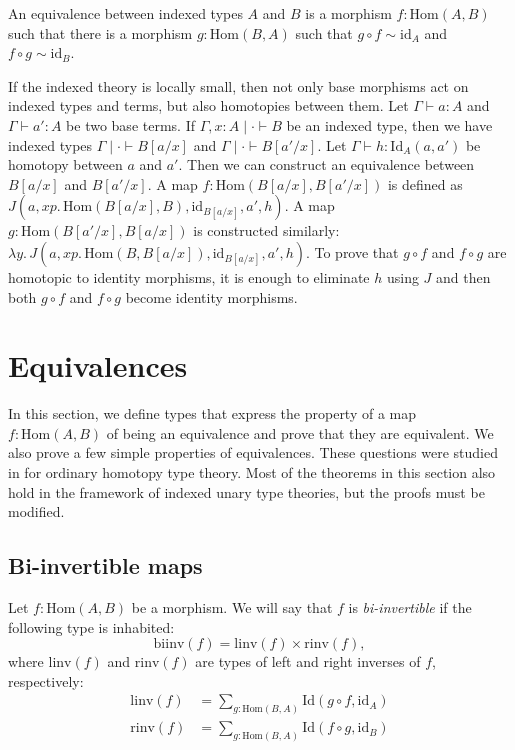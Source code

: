\documentclass[reqno]{amsart}
\theoremstyle{definition}
\theoremstyle{remark}
\newcommand{\ob}{}
\newcommand{\fs}[1]{\mathrm{#1}}
\newcommand{\Hom}{\fs{Hom}}
\newcommand{\Id}{\fs{Id}}
\newcommand{\id}{\fs{id}}
\numberwithin{figure}{section}
\begin{document}
\begin{defn}
An equivalence between indexed types $A$ and $B$ is a morphism $f : \Hom(A,B)$ such that there is a morphism $g : \Hom(B,A)$ such that $g \circ f \sim \id_A$ and $f \circ g \sim \id_B$.
\end{defn}

If the indexed theory is locally small, then not only base morphisms act on indexed types and terms, but also homotopies between them.
Let $\Gamma \vdash a : A$ and $\Gamma \vdash a' : A$ be two base terms.
If $\Gamma, x : A \mid \cdot \vdash B \ob$ be an indexed type, then we have indexed types $\Gamma \mid \cdot \vdash B[a/x] \ob$ and $\Gamma \mid \cdot \vdash B[a'/x] \ob$.
Let $\Gamma \vdash h : \Id_A(a,a')$ be homotopy between $a$ and $a'$.
Then we can construct an equivalence between $B[a/x]$ and $B[a'/x]$.
A map $f : \Hom(B[a/x],B[a'/x])$ is defined as $J(a, x p.\,\Hom(B[a/x],B), \id_{B[a/x]}, a', h)$.
A map $g : \Hom(B[a'/x],B[a/x])$ is constructed similarly: $\lambda y.\,J(a, x p.\,\Hom(B,B[a/x]), \id_{B[a/x]}, a', h)$.
To prove that $g \circ f$ and $f \circ g$ are homotopic to identity morphisms, it is enough to eliminate $h$ using $J$ and then both $g \circ f$ and $f \circ g$ become identity morphisms.

\section{Equivalences}

In this section, we define types that express the property of a map $f : \Hom(A,B)$ of being an equivalence and prove that they are equivalent.
We also prove a few simple properties of equivalences.
These questions were studied in \cite[Section~4]{hottbook} for ordinary homotopy type theory.
Most of the theorems in this section also hold in the framework of indexed unary type theories, but the proofs must be modified.

\subsection{Bi-invertible maps}

Let $f : \Hom(A,B)$ be a morphism.
We will say that $f$ is \emph{bi-invertible} if the following type is inhabited:
\[ \fs{biinv}(f) = \fs{linv}(f) \times \fs{rinv}(f), \]
where $\fs{linv}(f)$ and $\fs{rinv}(f)$ are types of left and right inverses of $f$, respectively:
\begin{align*}
\fs{linv}(f) & = \sum_{g : \Hom(B,A)} \Id(g \circ f, \id_A) \\
\fs{rinv}(f) & = \sum_{g : \Hom(B,A)} \Id(f \circ g, \id_B)
\end{align*}
\end{document}
